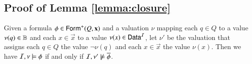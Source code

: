 \documentclass[10pt,conference,letterpaper,twocolumn]{IEEEtran}
\begin{document}
 

\appendix

\subsection{Proof of Lemma \ref{lemma:closure}}

\begin{proposition}\label{prop:overline}
  Given a formula $\phi \in \mathsf{Form}^+(Q,\mathbf x)$ and a valuation $\nu$
  mapping each $q \in Q$ to a value $\nu(q) \in \mathbb{B}$ and each $x \in
  \vec{x}$ to a value $\nu(x) \in \mathsf{Data}^{\mathcal{I}}$, let $\nu'$ be the
  valuation that assigns each $q \in Q$ the value $\neg\nu(q)$ and
  each $x \in \vec{x}$ the value $\nu(x)$. Then we have 
  $\mathcal{I},\nu \models \phi$ if and only if $\mathcal{I},\nu' \not\models \overline{\phi}$. 
\end{proposition}
\end{document}
